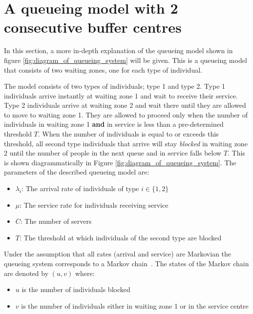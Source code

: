 \section{A queueing model with 2 consecutive buffer centres}\label{sec:queueing_model}
In this section, a more in-depth explanation of the queueing model shown in 
figure \ref{fig:diagram_of_queueing_system} will be given.
This is a queueing model that consists of two waiting zones, one for each type
of individual.

The model consists of two types of individuals; type 1 and type 2.
Type 1 individuals arrive instantly at waiting zone 1 and wait to receive their 
service. 
Type 2 individuals arrive at waiting zone 2 and wait there until they are 
allowed to move to waiting zone 1. 
They are allowed to proceed only when the number of 
individuals in waiting zone 1 \textbf{and} in service is less than a 
pre-determined threshold \(T\).
When the number of individuals is equal to or exceeds this threshold, all 
second type individuals that arrive will stay 
\textit{blocked} in waiting zone 2 until the number of people in 
the next queue and in service falls below \(T\). 
This is shown diagrammatically in Figure \ref{fig:diagram_of_queueing_system}.
The parameters of the described queueing model are:

\begin{itemize}
    \item \(\lambda_i\): The arrival rate of individuals of type 
    \(i\in\{1, 2\}\)
    \item \(\mu\): The service rate for individuals receiving service
    \item \(C\): The number of servers
    \item \(T\): The threshold at which individuals of the second type are 
    blocked
\end{itemize}

Under the assumption that all rates (arrival and service) are Markovian the
queueing system corresponds to a Markov chain~\cite{kemeny1976markov}.
The states of the Markov chain are denoted by \((u,v)\) where:

\begin{itemize}
    \item \(u\) is the number of individuals blocked
    \item \(v\) is the number of individuals either in waiting zone 1 or in the
    service centre
\end{itemize}

